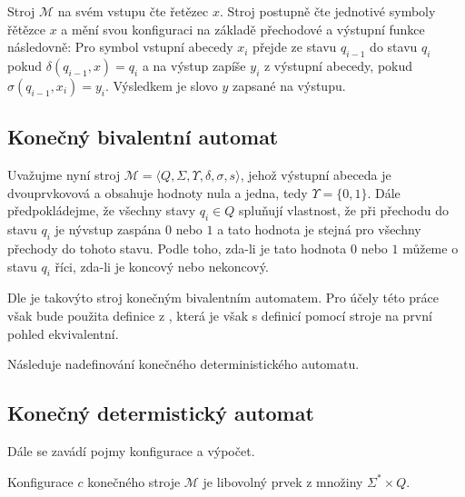 \documentclass[a4paper,10pt]{article}
\begin{document}
Stroj $\mathcal{M}$ na svém vstupu čte řetězec $x$. Stroj postupně čte jednotivé symboly řětězce $x$ a mění svou konfiguraci na základě přechodové a výstupní funkce následovně: Pro symbol vstupní abecedy $x_i$ přejde ze stavu $q_{i-1}$ do stavu $q_i$ pokud $\delta(q_{i-1}, x) = q_i$ a na výstup zapíše $y_i$ z výstupní abecedy, pokud $\sigma(q_{i-1}, x_i) = y_i$. Výsledkem je slovo $y$ zapsané na výstupu.


\subsection{Konečný bivalentní automat}

Uvažujme nyní stroj $\mathcal{M} = \langle Q, \Sigma, \Upsilon,  \delta, \sigma, s \rangle$, jehož výstupní abeceda je dvouprvkovová a obsahuje hodnoty nula a jedna, tedy $\Upsilon = \{0, 1\}$. Dále předpokládejme, že všechny stavy $q_i \in Q$ spluňují vlastnost, že při přechodu do stavu $q_i$ je nývstup zaspána $0$ nebo $1$ a tato hodnota je stejná pro všechny přechody do tohoto stavu. Podle toho, zda-li je tato hodnota $0$ nebo $1$ můžeme o stavu $q_i$ říci, zda-li je koncový nebo nekoncový. 

Dle \cite{modeson-malik-fuzz-aut-and-langs} je takovýto stroj konečným bivalentním automatem. Pro účely této práce však bude použita definice z \cite{kozen-automata-and-computability}, která je však s definicí pomocí stroje na první pohled ekvivalentní.

Následuje nadefinování konečného deterministického automatu.

\subsection{Konečný  determistický automat}


\begin{definition}\label{kda}
\end{definition}


Dále se zavádí pojmy konfigurace a výpočet.

\begin{definition}\label{machine-configuration}
Konfigurace $c$ konečného stroje $\mathcal{M}$ je libovolný prvek z množiny $\Sigma^* \times Q$.

\end{definition}
\end{document}

